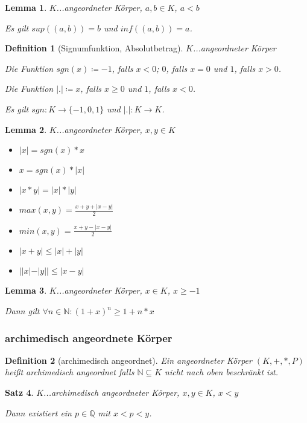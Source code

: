 \documentclass[twocolumn]{article}
\newtheorem{theorem}{Satz}[section]
\newtheorem{lemma}[theorem]{Lemma}
\newtheorem{definition}{Definition}[section]
\begin{document}
\begin{lemma}
	$K$...angeordneter Körper, $a,b \in K$, $a<b$
	
	Es gilt $sup((a,b))=b$ und $inf((a,b))=a$.
\end{lemma}

\begin{definition}[Signumfunktion, Absolutbetrag]
	$K$...angeordneter Körper
	
	Die Funktion $sgn(x) \coloneqq -1$, falls $x < 0$; $0$, falls $x = 0$ und $1$, falls $x > 0$.
	
	Die Funktion $|.| \coloneqq x$, falls $x \geq 0$ und $1$, falls $x < 0$.
	
	Es gilt $sgn: K \rightarrow \{-1, 0, 1\}$ und $|.|: K \rightarrow K$.
\end{definition}

\begin{lemma}
	$K$...angeordneter Körper, $x,y \in K$
	
	\begin{itemize}
		\item $|x|=sgn(x)*x$
		\item $x=sgn(x)*|x|$
		\item $|x*y|=|x|*|y|$
		\item $max(x,y)=\frac{x+y+|x-y|}{2}$
		\item $min(x,y)=\frac{x+y-|x-y|}{2}$
		\item $|x+y|\leq |x|+|y|$
		\item $||x|-|y||\leq |x-y|$
	\end{itemize}
\end{lemma}

\begin{lemma}
	$K$...angeordneter Körper, $x \in K$, $x \geq -1$
	
	Dann gilt $\forall n \in \mathbb{N} : (1 + x)^{n} \geq 1 + n * x$
\end{lemma}

\subsubsection{archimedisch angeordnete Körper}

\begin{definition}[archimedisch angeordnet]
	Ein angeordneter Körper $(K,+,*,P)$ heißt archimedisch angeordnet falls $\mathbb{N} \subseteq K$ nicht nach oben beschränkt ist.
\end{definition}

\begin{theorem}
	$K$...archimedisch angeordneter Körper, $x,y \in K$, $x<y$
	
	Dann existiert ein $p \in \mathbb{Q}$ mit $x<p<y$.
\end{theorem}
\end{document}
